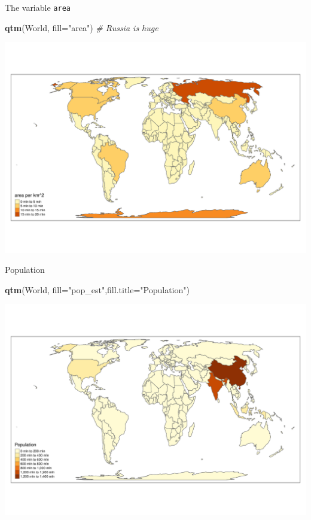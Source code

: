 \documentclass[
  ignorenonframetext,
]{beamer}
\newenvironment{Shaded}{\begin{snugshade}}{\end{snugshade}}
\newcommand{\CommentTok}[1]{\textcolor[rgb]{0.56,0.35,0.01}{\textit{#1}}}
\newcommand{\DataTypeTok}[1]{\textcolor[rgb]{0.13,0.29,0.53}{#1}}
\newcommand{\KeywordTok}[1]{\textcolor[rgb]{0.13,0.29,0.53}{\textbf{#1}}}
\newcommand{\NormalTok}[1]{#1}
\newcommand{\StringTok}[1]{\textcolor[rgb]{0.31,0.60,0.02}{#1}}
\begin{document}
\begin{frame}[fragile]{The variable \texttt{area}}
\protect\hypertarget{the-variable-area}{}
\begin{Shaded}
\begin{Highlighting}[]
\KeywordTok{qtm}\NormalTok{(World, }\DataTypeTok{fill=}\StringTok{"area"}\NormalTok{) }\CommentTok{\# Russia is huge}
\end{Highlighting}
\end{Shaded}

\includegraphics{quick_high_quality_maps_files/figure-beamer/unnamed-chunk-10-1.pdf}
\end{frame}

\begin{frame}[fragile]{Population}
\protect\hypertarget{population-1}{}
\begin{Shaded}
\begin{Highlighting}[]
\KeywordTok{qtm}\NormalTok{(World, }\DataTypeTok{fill=}\StringTok{"pop\_est"}\NormalTok{,}\DataTypeTok{fill.title=}\StringTok{"Population"}\NormalTok{) }
\end{Highlighting}
\end{Shaded}

\includegraphics{quick_high_quality_maps_files/figure-beamer/unnamed-chunk-11-1.pdf}
\end{frame}
\end{document}
